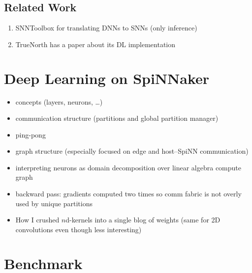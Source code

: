 \documentclass[]{article}
\begin{document}



\subsection{Related Work} %
\label{subsec:related_work}

\begin{enumerate}
  \item SNNToolbox for translating DNNs to SNNs (only inference)
  \item TrueNorth has a paper about its DL implementation
\end{enumerate}




\section{Deep Learning on SpiNNaker}
\label{sec:SpiDNN}

\begin{itemize}
  \item concepts (layers, neurons, \dots)
  \item communication structure (partitions and global partition manager)
  \item ping-pong
  \item graph structure (especially focused on edge and host--SpiNN
    communication)
  \item interpreting neurons as domain decomposition over linear algebra
    compute graph
  \item backward pass: gradients computed two times so comm fabric is
    not overly used by unique partitions
  \item How I crushed $n$d-kernels into a single blog of weights (same
    for 2D convolutions even though less interesting)
\end{itemize}

\section{Benchmark}
\label{sec:benchmark}
\end{document}
